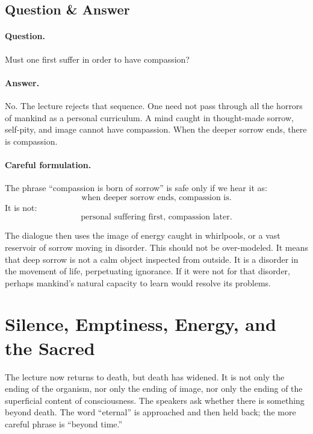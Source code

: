 \subsection{Question \& Answer}

\paragraph{Question.}
Must one first suffer in order to have compassion?

\paragraph{Answer.}
No. The lecture rejects that sequence. One need not pass through all the horrors of mankind as a personal curriculum. A mind caught in thought-made sorrow, self-pity, and image cannot have compassion. When the deeper sorrow ends, there is compassion.

\paragraph{Careful formulation.}
The phrase ``compassion is born of sorrow'' is safe only if we hear it as:
\begin{equation}
\text{when deeper sorrow ends, compassion is}.
\end{equation}
It is not:
\begin{equation}
\text{personal suffering first, compassion later}.
\end{equation}

The dialogue then uses the image of energy caught in whirlpools, or a vast reservoir of sorrow moving in disorder. This should not be over-modeled. It means that deep sorrow is not a calm object inspected from outside. It is a disorder in the movement of life, perpetuating ignorance. If it were not for that disorder, perhaps mankind's natural capacity to learn would resolve its problems.

\section{Silence, Emptiness, Energy, and the Sacred}

The lecture now returns to death, but death has widened. It is not only the ending of the organism, nor only the ending of image, nor only the ending of the superficial content of consciousness. The speakers ask whether there is something beyond death. The word ``eternal'' is approached and then held back; the more careful phrase is ``beyond time.''


